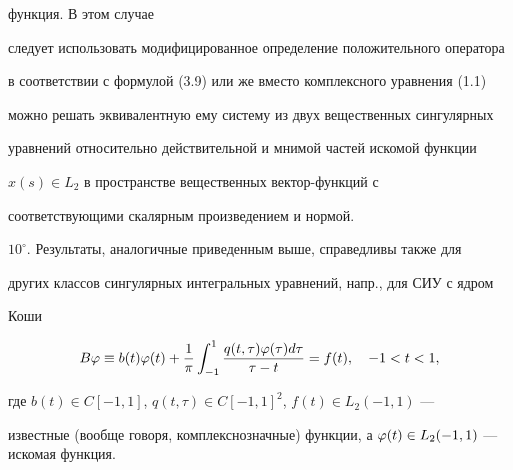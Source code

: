 функция. В этом случае


следует использовать модифицированное определение положительного оператора


в соответствии с формулой (3.9) или же вместо комплексного уравнения (1.1)


можно решать эквивалентную ему систему из двух вещественных сингулярных


уравнений относительно действительной и мнимой частей искомой функции


$x(s)\in L_2$ в пространстве вещественных вектор-функций с


соответствующими скалярным произведением и нормой.





$10^\circ$. Результаты, аналогичные приведенным выше, справедливы также для


других классов сингулярных интегральных уравнений, напр., для СИУ с ядром


Коши


$$


  B\vp \equiv b(t)\vp(t)+\frac{1}{\pi}\int_{-




1}^{1}\frac{q(t,\tau)\vp(\tau)d\tau}{\tau-t} = f(t),\quad -1<t<1,


$$


где $b(t)\in C[-1,1]$, $q(t,\tau)\in C[-1,1]^2$, $f(t)\in L_2(-1,1)$ ---


известные (вообще говоря, комплекснозначные) функции, а $\vp(t)\in L_2(-


1,1)$ --- искомая функция.








